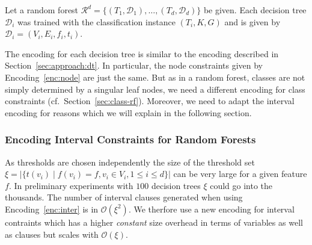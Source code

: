 \documentclass{easychair}
\theoremstyle{definition}
\begin{document}
Let a random forest $\mathcal{R}^d = \{ (T_1, \mathcal{D}_1), \dots, (T_d, \mathcal{D}_d) \}$ be given. 
Each decision tree $\mathcal{D}_i$ was trained with the classification instance $(T_i, K, G)$ and is given by $\mathcal{D}_i=(V_i, E_i, f_i, t_i)$. 

The encoding for each decision tree is similar to the encoding described in Section~\ref{sec:approach:dt}. 
In particular, the node constraints given by Encoding~\ref{enc:node} are just the same. 
But as in a random forest, classes are not simply determined by a singular leaf nodes, we need a different encoding for class constraints (cf.~Section~\ref{sec:class-rf}). 
Moreover, we need to adapt the interval encoding for reasons which we will explain in the following section. 


\subsubsection{Encoding Interval Constraints for Random Forests}
\label{sec:interval-rf}

As thresholds are chosen independently the size of the threshold set $\xi=|\{ t(v_i) \mid f(v_i) = f, v_i \in V_i, 1 \leq i \leq d \}|$ can be very large for a given feature $f$. 
In preliminary experiments with $100$ decision trees $\xi$ could go into the thousands. 
The number of interval clauses generated when using Encoding~\ref{enc:inter} is in $\mathcal{O}(\xi^2)$. 
We therfore use a new encoding for interval contraints which has a higher \emph{constant} size overhead in terms of variables as well as clauses but scales with $\mathcal{O}(\xi)$. 
\end{document}
